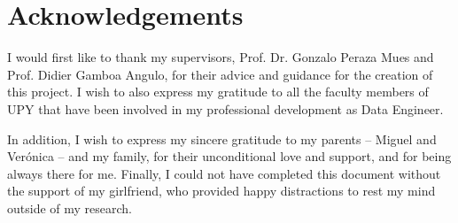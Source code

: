 \chapter{Acknowledgements}
\label{cha:acknowledgments}

I would first like to thank my supervisors, Prof. Dr. Gonzalo Peraza Mues and Prof. Didier Gamboa Angulo, for their advice and guidance for the creation of this project. I wish to also express my gratitude to all the faculty members of UPY that have been involved in my professional development as Data Engineer.

In addition, I wish to express my sincere gratitude to my parents -- Miguel and Verónica -- and my family, for their unconditional love and support, and for being always there for me. Finally, I could not have completed this document without the support of my girlfriend, who provided happy distractions to rest my mind outside of my research.





